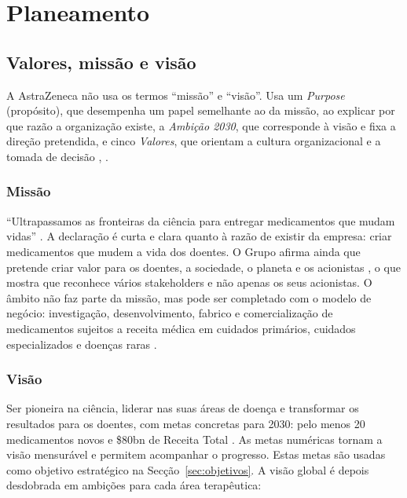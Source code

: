 \chapter{Planeamento}

\section{Valores, missão e visão}
A AstraZeneca não usa os termos ``missão'' e ``visão''. Usa um \textit{Purpose} (propósito), que desempenha um papel semelhante ao da missão, ao explicar por que razão a organização existe, a \textit{Ambição 2030}, que corresponde à visão e fixa a direção pretendida, e cinco \textit{Valores}, que orientam a cultura organizacional e a tomada de decisão \cite[pp.~8, 10]{AR}, \cite[pp.~15--16]{PLAN}.

\subsection{Missão}
``Ultrapassamos as fronteiras da ciência para entregar medicamentos que mudam vidas'' \cite[p.~8]{AR}. A declaração é curta e clara quanto à razão de existir da empresa: criar medicamentos que mudem a vida dos doentes. O Grupo afirma ainda que pretende criar valor para os doentes, a sociedade, o planeta e os acionistas \cite[p.~8]{AR}, o que mostra que reconhece vários stakeholders e não apenas os seus acionistas. O âmbito não faz parte da missão, mas pode ser completado com o modelo de negócio: investigação, desenvolvimento, fabrico e comercialização de medicamentos sujeitos a receita médica em cuidados primários, cuidados especializados e doenças raras \cite[p.~8]{AR}.

\subsection{Visão}
Ser pioneira na ciência, liderar nas suas áreas de doença e transformar os resultados para os doentes, com metas concretas para 2030: pelo menos 20 medicamentos novos e \$80bn de Receita Total \cite[p.~10]{AR}. As metas numéricas tornam a visão mensurável e permitem acompanhar o progresso. Estas metas são usadas como objetivo estratégico na Secção~\ref{sec:objetivos}. A visão global é depois desdobrada em ambições para cada área terapêutica:

